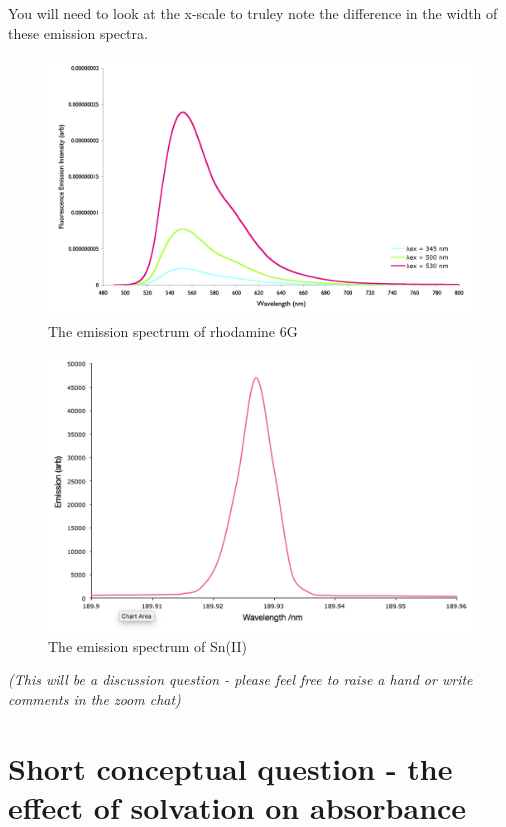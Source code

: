 \documentclass[
]{book}
\begin{document}
You will need to look at the x-scale to truley note the difference in the width of these emission spectra.

\begin{figure}

{\centering \includegraphics[width=0.7\linewidth]{images/rhodamine6G} 

}

\caption{The emission spectrum of rhodamine 6G}\label{fig:molecular}
\end{figure}

\begin{figure}

{\centering \includegraphics[width=0.7\linewidth]{images/atomic_emission_spectrum} 

}

\caption{The emission spectrum of Sn(II)}\label{fig:atomic}
\end{figure}

\emph{(This will be a discussion question - please feel free to raise a hand or write comments in the zoom chat)}

\hypertarget{sec:solvationabs}{%
\section{Short conceptual question - the effect of solvation on absorbance}\label{sec:solvationabs}}
\end{document}
